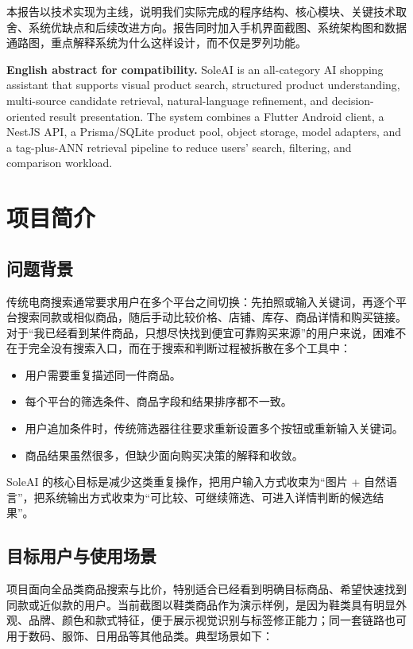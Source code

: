 \documentclass[UTF8,a4paper,zihao=-4]{ctexart}
\begin{document}
本报告以技术实现为主线，说明我们实际完成的程序结构、核心模块、关键技术取舍、系统优缺点和后续改进方向。报告同时加入手机界面截图、系统架构图和数据通路图，重点解释系统为什么这样设计，而不仅是罗列功能。

\noindent\textbf{English abstract for compatibility.} SoleAI is an all-category AI shopping assistant that supports visual product search, structured product understanding, multi-source candidate retrieval, natural-language refinement, and decision-oriented result presentation. The system combines a Flutter Android client, a NestJS API, a Prisma/SQLite product pool, object storage, model adapters, and a tag-plus-ANN retrieval pipeline to reduce users' search, filtering, and comparison workload.

\section{项目简介}

\subsection{问题背景}

传统电商搜索通常要求用户在多个平台之间切换：先拍照或输入关键词，再逐个平台搜索同款或相似商品，随后手动比较价格、店铺、库存、商品详情和购买链接。对于“我已经看到某件商品，只想尽快找到便宜可靠购买来源”的用户来说，困难不在于完全没有搜索入口，而在于搜索和判断过程被拆散在多个工具中：

\begin{itemize}
  \item 用户需要重复描述同一件商品。
  \item 每个平台的筛选条件、商品字段和结果排序都不一致。
  \item 用户追加条件时，传统筛选器往往要求重新设置多个按钮或重新输入关键词。
  \item 商品结果虽然很多，但缺少面向购买决策的解释和收敛。
\end{itemize}

SoleAI 的核心目标是减少这类重复操作，把用户输入方式收束为“图片 + 自然语言”，把系统输出方式收束为“可比较、可继续筛选、可进入详情判断的候选结果”。

\subsection{目标用户与使用场景}

项目面向全品类商品搜索与比价，特别适合已经看到明确目标商品、希望快速找到同款或近似款的用户。当前截图以鞋类商品作为演示样例，是因为鞋类具有明显外观、品牌、颜色和款式特征，便于展示视觉识别与标签修正能力；同一套链路也可用于数码、服饰、日用品等其他品类。典型场景如下：
\end{document}
